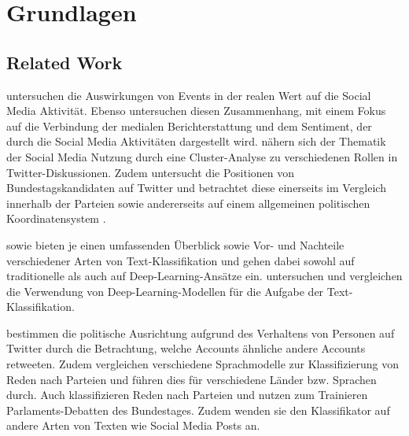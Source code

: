 
\chapter{Grundlagen} \label{ch:materialsAndMethods}


\section{Related Work}

\textcite{kalyanam_prediction_2016} untersuchen die Auswirkungen von Events in der realen Wert auf die Social Media Aktivität. Ebenso untersuchen \textcite{tsytsarau_dynamics_2014} diesen Zusammenhang, mit einem Fokus auf die Verbindung der medialen Berichterstattung und dem Sentiment, der durch die Social Media Aktivitäten dargestellt wird.
\textcite{gimpel_user_2018} nähern sich der Thematik der Social Media Nutzung durch eine Cluster-Analyse zu verschiedenen Rollen in Twitter-Diskussionen.
Zudem untersucht \textcite{saltzer_bundestagswahl_2022} die Positionen von Bundestagskandidaten auf Twitter und betrachtet diese einerseits im Vergleich innerhalb der Parteien sowie andererseits auf einem allgemeinen politischen Koordinatensystem \autocite{saltzer_bundestagswahl_2022, saltzer_finding_2022}.

\textcite{li_survey_2021} sowie \textcite{kowsari_text_2019} bieten je einen umfassenden Überblick sowie Vor- und Nachteile verschiedener Arten von Text-Klassifikation und gehen dabei sowohl auf traditionelle als auch auf Deep-Learning-Ansätze ein.
\textcite{minaee_deep_2022} untersuchen und vergleichen die Verwendung von Deep-Learning-Modellen für die Aufgabe der Text-Klassifikation.

\textcite{wong_quantifying_2016} bestimmen die politische Ausrichtung aufgrund des Verhaltens von Personen auf Twitter durch die Betrachtung, welche Accounts ähnliche andere Accounts retweeten.
Zudem vergleichen \textcite{doan_using_2022} verschiedene Sprachmodelle zur Klassifizierung von Reden nach Parteien und führen dies für verschiedene Länder bzw. Sprachen durch.
Auch \textcite{biessmann_predicting_2016} klassifizieren Reden nach Parteien und nutzen zum Trainieren Parlaments-Debatten des Bundestages. Zudem wenden sie den Klassifikator auf andere Arten von Texten wie Social Media Posts an.

